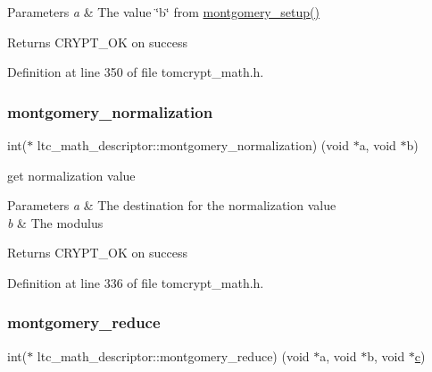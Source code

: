 \begin{DoxyParams}{Parameters}
{\em a} & The value \char`\"{}b\char`\"{} from \mbox{\hyperlink{structltc__math__descriptor_ab371384383f0e671c6211d6b0e439f3d}{montgomery\+\_\+setup()}} \\
\hline
\end{DoxyParams}
\begin{DoxyReturn}{Returns}
C\+R\+Y\+P\+T\+\_\+\+OK on success 
\end{DoxyReturn}


Definition at line 350 of file tomcrypt\+\_\+math.\+h.

\mbox{\label{structltc__math__descriptor_a78422650d8687db2363f716434c29605}} 
\subsubsection{\texorpdfstring{montgomery\_normalization}{montgomery\_normalization}}
{\footnotesize\ttfamily int($\ast$ ltc\+\_\+math\+\_\+descriptor\+::montgomery\+\_\+normalization) (void $\ast$a, void $\ast$b)}



get normalization value 


\begin{DoxyParams}{Parameters}
{\em a} & The destination for the normalization value \\
\hline
{\em b} & The modulus \\
\hline
\end{DoxyParams}
\begin{DoxyReturn}{Returns}
C\+R\+Y\+P\+T\+\_\+\+OK on success 
\end{DoxyReturn}


Definition at line 336 of file tomcrypt\+\_\+math.\+h.

\mbox{\label{structltc__math__descriptor_a337d88eba818e96370144d654ffb19d7}} 
\subsubsection{\texorpdfstring{montgomery\_reduce}{montgomery\_reduce}}
{\footnotesize\ttfamily int($\ast$ ltc\+\_\+math\+\_\+descriptor\+::montgomery\+\_\+reduce) (void $\ast$a, void $\ast$b, void $\ast$\mbox{\hyperlink{khazad_8c_a86ea50de5a3e0ae87762f4298d35284c}{c}})}



